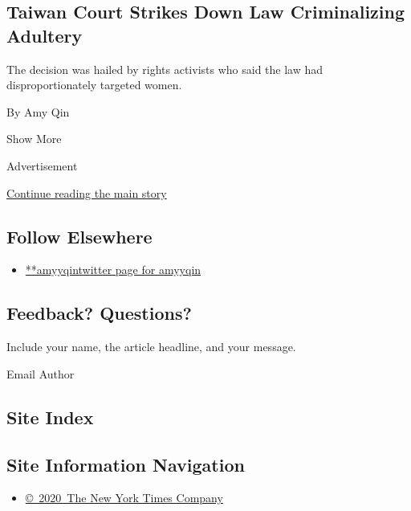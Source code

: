 \begin{enumerate}
  \hypertarget{taiwan-court-strikes-down-law-criminalizing-adultery}{%
  \subsection{Taiwan Court Strikes Down Law Criminalizing
  Adultery}\label{taiwan-court-strikes-down-law-criminalizing-adultery}}

  The decision was hailed by rights activists who said the law had
  disproportionately targeted women.

  By Amy Qin
\end{enumerate}

Show More

Advertisement

\protect\hyperlink{after-mid2}{Continue reading the main story}

\hypertarget{follow-elsewhere}{%
\subsection{Follow Elsewhere}\label{follow-elsewhere}}

\begin{itemize}
\tightlist
\item
  \href{https://twitter.com/amyyqin}{**amyyqintwitter page for amyyqin}
\end{itemize}

\hypertarget{feedback-questions}{%
\subsection{Feedback? Questions?}\label{feedback-questions}}

Include your name, the article headline, and your message.

Email Author

\hypertarget{site-index}{%
\subsection{Site Index}\label{site-index}}

\hypertarget{site-information-navigation}{%
\subsection{Site Information
Navigation}\label{site-information-navigation}}

\begin{itemize}
\tightlist
\item
  \href{https://help.nytimes.com/hc/en-us/articles/115014792127-Copyright-notice}{©~2020~The
  New York Times Company}
\end{itemize}

